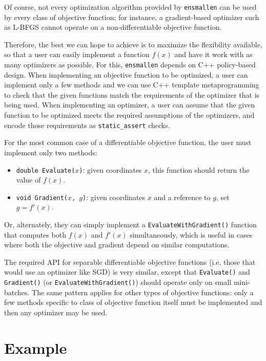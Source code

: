 \documentclass{article}
\begin{document}
Of course, not every optimization algorithm provided by {\tt ensmallen} can be
used by every class of objective function; for instance, a gradient-based
optimizer such as L-BFGS cannot operate on a non-differentiable objective
function.

Therefore, the best we can hope to achieve is to maximize the flexibility
available, so that a user can easily implement a function $f(x)$ and have it
work with as many optimizers as possible.  For this, {\tt ensmallen} depends on
C++ policy-based design.  When implementing an objective function to be
optimized, a user can implement only a few methods and we can use C++ template
metaprogramming to check that the given functions match the requirements of the
optimizer that is being used.  When implementing an optimizer, a user can assume
that the given function to be optimized meets the required assumptions of the
optimizers, and encode those requirements as \texttt{static\_assert} checks.

For the most common case of a differentiable objective function, the user must
implement only two methods:

\begin{itemize}
  \item \texttt{double Evaluate($x$)}: given coordinates $x$, this function
should return the value of $f(x)$.
  \item \texttt{void Gradient($x$, $g$)}: given coordinates $x$ and a reference
to $g$, set $g = f'(x)$.
\end{itemize}

Or, alternately, they can simply implement a \texttt{EvaluateWithGradient()}
function that computes both $f(x)$ and $f'(x)$ simultaneously, which is useful
in cases where both the objective and gradient depend on similar computations.

The required API for separable differentiable objective functions (i.e. those
that would use an optimizer like SGD) is very similar, except that
\texttt{Evaluate()} and \texttt{Gradient()} (or \texttt{EvaluateWithGradient()})
should operate only on small mini-batches.  The same pattern applies for other
types of objective functions: only a few methods specific to class of objective
function itself must be implemented and then any optimizer may be used.

\section{Example}
\end{document}

